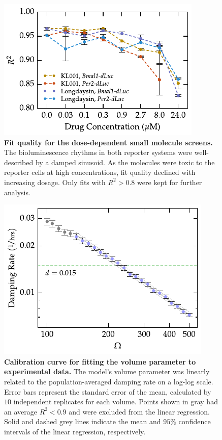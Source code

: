 \documentclass[11pt, letterpaper]{article}
\begin{document}
\begin{figure}[tbp]
  \begin{center}
    \includegraphics[]{figures/pdfs/small_molecule_r2.pdf}
  \end{center}
  \caption{{\bfseries Fit quality for the dose-dependent small molecule screens.} The bioluminescence rhythms in both reporter systems were well-described by a damped sinusoid. As the molecules were toxic to the reporter cells at high concentrations, fit quality declined with increasing dosage. Only fits with $R^2 > 0.8$ were kept for further analysis.}
\label{fig:small_molecule_r2}
\end{figure}

\begin{figure}[tbp]
  \begin{center}
    \includegraphics[]{figures/pdfs/volume_calibration.pdf}
  \end{center}
  \caption{{\bfseries Calibration curve for fitting the volume parameter to experimental data.} The model's volume parameter was linearly related to the population-averaged damping rate on a log-log scale. Error bars represent the standard error of the mean, calculated by $10$ independent replicates for each volume. Points shown in gray had an average $R^2 < 0.9$ and were excluded from the linear regression. Solid and dashed grey lines indicate the mean and $95\%$ confidence intervals of the linear regression, respectively.}
\label{fig:vol_calibration}
\end{figure}
\end{document}
